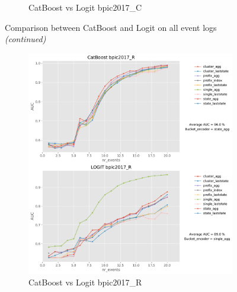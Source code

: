 \documentclass[twoside,11pt]{Latex/Classes/PhDthesisPSnPDF}
\begin{document}
\begin{figure}[t!]
\begin{subfigure}{0.48\textwidth}
		\caption{CatBoost vs Logit bpic2017\_C} \label{fig:b17ccl}
	\end{subfigure}
	\caption{Comparison between CatBoost and Logit on all event logs \textit{(continued)}}
\label{fig:r2cl}
\end{figure}


\begin{figure}[t!] %
		
	\begin{subfigure}{0.48\textwidth}
		\includegraphics[width=\linewidth]{images/catboost/graphslogit/bpic2017_R_CatBoost_logit.pdf}
		\caption{CatBoost vs Logit bpic2017\_R} \label{fig:b17rcl}
	\end{subfigure}\hspace*{\fill}
	\begin{subfigure}{0.48\textwidth}

\end{subfigure}
\end{figure}
\end{document}
